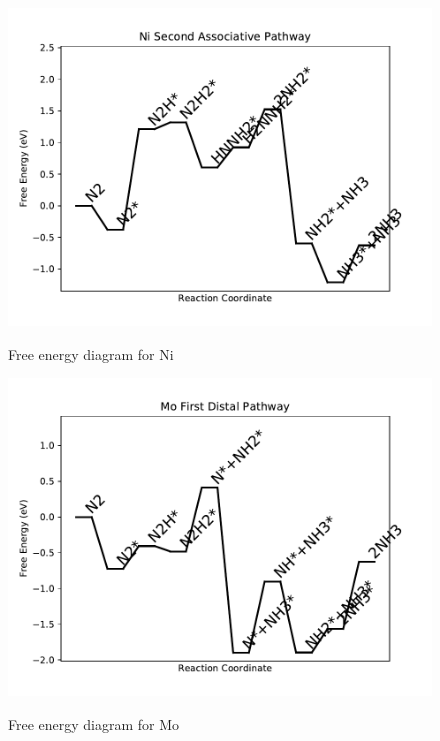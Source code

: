 \documentclass[journal=jacsat,manuscript=article]{achemso}
\begin{document}
\begin{figure}
\includegraphics[width=1\linewidth]{data/plots/Ni_associative_2.pdf}
\label{fig:Ni_associative_2}
\caption{Free energy diagram for Ni}
\end{figure}

\newpage
\begin{figure}
\includegraphics[width=1\linewidth]{data/plots/Mo_distal_1.pdf}
\label{fig:Mo_distal_1}
\caption{Free energy diagram for Mo}
\end{figure}
\end{document}
